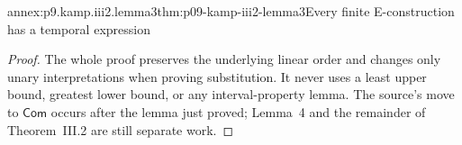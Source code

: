 \begin{annexitem}{annex:p9.kamp.iii2.lemma3}{thm:p09-kamp-iii2-lemma3}{Every finite E-construction has a temporal expression}
\begin{proof}
The whole proof preserves the underlying linear order and changes only
unary interpretations when proving substitution. It never uses a least
upper bound, greatest lower bound, or any interval-property lemma. The
source's move to \(\mathsf{Com}\) occurs after the lemma just proved;
Lemma~4 and the remainder of Theorem~III.2 are still separate work.
\end{proof}
\end{annexitem}
